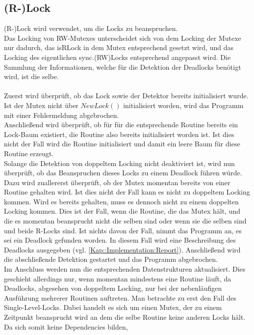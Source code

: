 \subsection{(R-)Lock}
(R-)Lock wird verwendet, um die Locks zu beanspruchen.\\
Das Locking von RW-Mutexes unterscheidet sich von dem Locking der Mutexe nur
dadurch, das isRLock in dem Mutex entsprechend gesetzt wird, und das 
Locking des eigentlichen sync.(RW)Locks entsprechend angepasst wird. Die 
Sammlung der Informationen, welche für die Detektion der Deadlocks benötigt
wird, ist die selbe.\\\\
Zuerst wird überprüft, ob das Lock sowie der Detektor bereits initialisiert 
wurde. Ist der Mutex nicht über $NewLock()$ initialisiert worden, wird das 
Programm mit einer Fehlermeldung abgebrochen. \\
Anschließend wird überprüft, ob für für die entsprechende Routine bereits ein 
Lock-Baum existiert, die Routine also bereits initialisiert worden ist. 
Ist dies nicht der Fall wird die Routine initialisiert und damit ein leere Baum 
für diese Routine erzeugt.\\
Solange die Detektion von doppeltem Locking nicht deaktiviert ist, wird nun
überprüft, ob das Beanspruchen dieses Locks zu einem Deadlock führen würde.
Dazu wird zuallererst überprüft, ob der Mutex momentan bereits von einer 
Routine gehalten wird. Ist dies nicht der Fall kann es nicht zu doppeltem Locking 
kommen. Wird es bereits gehalten, muss es dennoch nicht zu einem doppelten 
Locking kommen. Dies ist der Fall, wenn die Routine, die das Mutex hält, und 
die es momentan beansprucht nicht die selben sind oder wenn sie die selben 
sind und beide R-Locks sind. Ist nichts davon der Fall, nimmt das Programm an, 
es sei ein Deadlock gefunden worden. In diesem Fall wird eine Beschreibung des 
Deadlocks ausgegeben (vgl. \ref{Kap::Implementation:Report}). Anschließend wird 
die abschließende Detektion gestartet und das Programm abgebrochen.\\
Im Anschluss werden nun die entsprechenden Datenstrukturen aktualisiert. Dies geschieht 
allerdings nur, wenn momentan mindestens eine Routine läuft, da Deadlocks, abgesehen
von doppeltem Locking, nur bei der nebenläufigen Ausführung mehrerer Routinen 
auftreten. Man betrachte zu erst den Fall des Single-Level-Locks. Dabei handelt es 
sich um einen Mutex, der zu einem Zeitpunkt beansprucht wird an dem die 
selbe Routine keine anderen Locks hält. Da sich somit keine Dependencies bilden,
